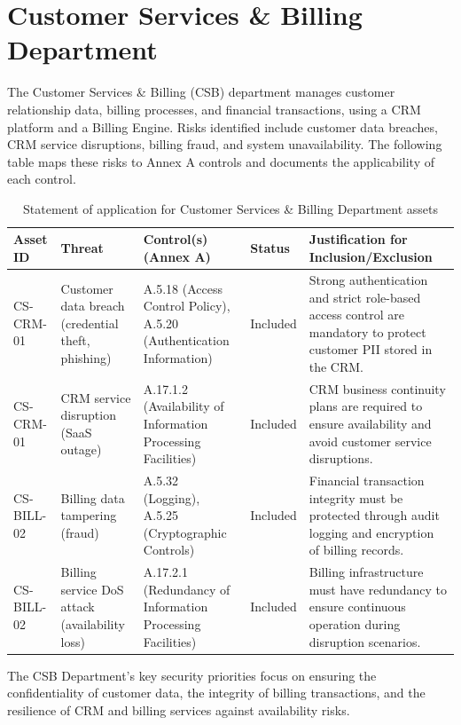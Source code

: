 \section{Customer Services \& Billing Department}

The Customer Services \& Billing (CSB) department manages customer relationship data, billing processes, and financial transactions, using a CRM platform and a Billing Engine.
Risks identified include customer data breaches, CRM service disruptions, billing fraud, and system unavailability.
The following table maps these risks to Annex A controls and documents the applicability of each control.

\begin{longtable}{|p{2cm}|p{3cm}|p{4cm}|p{2cm}|p{4cm}|}
    \caption{Statement of application for Customer Services \& Billing Department assets}                                                                                                                                                                                               \\
    \hline
    \textbf{Asset ID} & \textbf{Threat}                                   & \textbf{Control(s) (Annex A)}                                       & \textbf{Status} & \textbf{Justification for Inclusion/Exclusion}                                                                      \\
    \hline
    \endhead
    CS-CRM-01         & Customer data breach (credential theft, phishing) & A.5.18 (Access Control Policy), A.5.20 (Authentication Information) & Included        & Strong authentication and strict role-based access control are mandatory to protect customer PII stored in the CRM. \\
    \hline
    CS-CRM-01         & CRM service disruption (SaaS outage)              & A.17.1.2 (Availability of Information Processing Facilities)        & Included        & CRM business continuity plans are required to ensure availability and avoid customer service disruptions.           \\
    \hline
    CS-BILL-02        & Billing data tampering (fraud)                    & A.5.32 (Logging), A.5.25 (Cryptographic Controls)                   & Included        & Financial transaction integrity must be protected through audit logging and encryption of billing records.          \\
    \hline
    CS-BILL-02        & Billing service DoS attack (availability loss)    & A.17.2.1 (Redundancy of Information Processing Facilities)          & Included        & Billing infrastructure must have redundancy to ensure continuous operation during disruption scenarios.             \\
    \hline
\end{longtable}

The CSB Department's key security priorities focus on ensuring the confidentiality of customer data, the integrity of billing transactions, and the resilience of CRM and billing services against availability risks.
